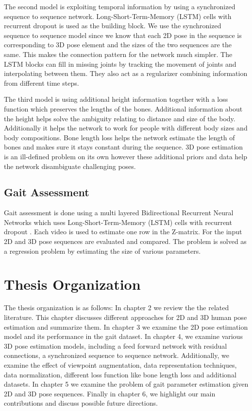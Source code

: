 The second model is exploiting temporal information by using a synchronized sequence to sequence network. Long-Short-Term-Memory (LSTM) \parencite{hochreiter1997long} cells with recurrent dropout \parencite{semeniuta2016recurrent} is used as the building block. We use the synchronized sequence to sequence model since we know that each 2D pose in the sequence is corresponding to 3D pose element and the sizes of the two sequences are the same. This makes the connection pattern for the network much simpler. The LSTM blocks can fill in missing joints by tracking the movement of joints and interpolating between them. They also act as a regularizer combining information from different time steps.  

The third model is using additional height information together with a loss function which preserves the lengths of the bones. Additional information about the height helps solve the ambiguity relating to distance and size of the body. Additionally it helps the network to work for people with different body sizes and body compositions. Bone length loss helps the network estimate the length of bones and makes sure it stays constant during the sequence. 3D pose estimation is an ill-defined problem on its own however these additional priors and data help the network disambiguate challenging poses.

\subsection{Gait Assessment}

Gait assessment is done using a multi layered Bidirectional Recurrent Neural Networks \parencite{schuster1997bidirectional} which uses Long-Short-Term-Memory (LSTM) \parencite{hochreiter1997long} cells with recurrent dropout \parencite{semeniuta2016recurrent}. Each video is used to estimate one row in the Z-matrix. For the input 2D and 3D pose sequences are evaluated and compared. The problem is solved as a regression problem by estimating the size of various parameters.

\section{Thesis Organization}

The thesis organization is as follows: In chapter 2 we review the the related literature. This chapter discusses different approaches for 2D and 3D human pose estimation and summarize them. In chapter 3 we examine the 2D pose estimation model and its performance in the gait dataset. In chapter 4, we examine various 3D pose estimation models, including a feed forward network with residual connections, a synchronized sequence to sequence network. Additionally, we examine the effect of viewpoint augmentation, data representation techniques, data normalization, different loss function like bone length loss and additional datasets. In chapter 5 we examine the problem of gait parameter estimation given 2D and 3D pose sequences. Finally in chapter 6, we highlight our main contributions and discuss possible future directions. 